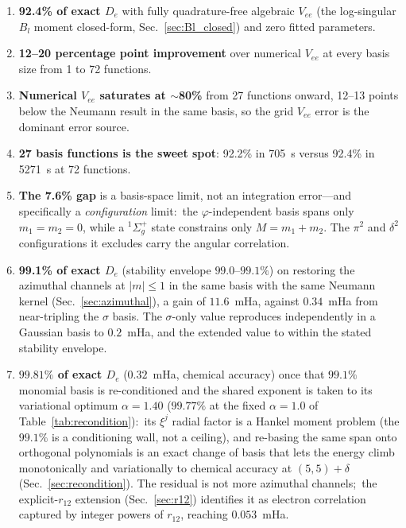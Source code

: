 \documentclass[aps,pra,twocolumn,superscriptaddress,longbibliography]{revtex4-2}
\newcommand{\gvq}[2]{#2}
\begin{document}
\begin{enumerate}
  \item \textbf{92.4\% of exact $D_e$} with fully quadrature-free
    algebraic $V_{ee}$ (the log-singular $B_l$ moment closed-form,
    Sec.~\ref{sec:Bl_closed}) and zero fitted parameters.
  \item \textbf{12--20 percentage point improvement} over numerical
    $V_{ee}$ at every basis size from 1 to 72 functions.
  \item \textbf{Numerical $V_{ee}$ saturates at $\sim$80\%}
    from 27 functions onward, 12--13 points below the Neumann
    result in the same basis, so the grid $V_{ee}$ error is the
    dominant error source.
  \item \textbf{27 basis functions is the sweet spot}: 92.2\%
    in 705~s versus 92.4\% in 5271~s at 72 functions.
  \item \textbf{The 7.6\% gap} is a basis-space limit, not an
    integration error---and specifically a \emph{configuration}
    limit:\ the $\varphi$-independent basis spans only
    $m_1 = m_2 = 0$, while a $^1\Sigma_g^+$ state constrains only
    $M = m_1 + m_2$.  The $\pi^2$ and $\delta^2$ configurations it
    excludes carry the angular correlation.
  \item \textbf{99.1\% of exact $D_e$} (stability envelope
    $99.0$--$99.1\%$) on restoring the azimuthal
    channels at $|m| \le 1$ in the same basis with the same
    Neumann kernel (Sec.~\ref{sec:azimuthal}), a gain of
    $\gvq{p12_azimuthal_gain_mha}{11.6}$~mHa, against
    $\gvq{p12_sigma_growth_mha}{0.34}$~mHa from near-tripling the $\sigma$
    basis.
    The $\sigma$-only value reproduces independently in a Gaussian
    basis to $0.2$~mHa, and the extended value to within the stated
    stability envelope.
  \item \textbf{$\gvq{p12_rebased_de_pct_aopt}{99.81}\%$ of exact $D_e$}
    ($\gvq{p12_rebased_err_mha_aopt}{0.32}$~mHa, chemical accuracy) once that
    $99.1\%$ monomial basis is re-conditioned and the shared exponent is taken to
    its variational optimum $\alpha = \gvq{p12_rebased_alpha_opt}{1.40}$
    ($\gvq{p12_rebased_de_pct}{99.77}\%$ at the fixed $\alpha = 1.0$ of
    Table~\ref{tab:recondition}):\ its $\xi^j$ radial factor
    is a Hankel moment problem (the $99.1\%$ is a conditioning wall, not
    a ceiling), and re-basing the same span onto orthogonal polynomials
    is an exact change of basis that lets the energy climb monotonically
    and variationally to chemical accuracy at $(5,5)+\delta$
    (Sec.~\ref{sec:recondition}).  The residual is not more azimuthal
    channels;\ the explicit-$r_{12}$ extension (Sec.~\ref{sec:r12})
    identifies it as electron correlation captured by integer powers of
    $r_{12}$, reaching $\gvq{p12_r12_err_mha}{0.053}$~mHa.
\end{enumerate}
\end{document}
